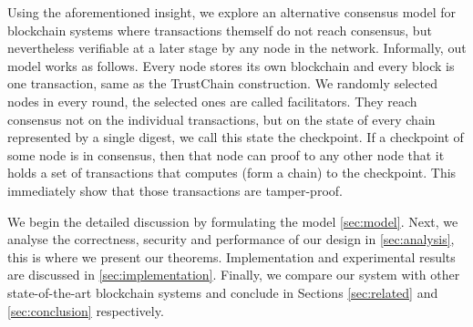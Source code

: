 Using the aforementioned insight,
we explore an alternative consensus model for blockchain systems where transactions themself do not reach consensus,
but nevertheless verifiable at a later stage by any node in the network.
Informally, out model works as follows.
Every node stores its own blockchain and every block is one transaction, same as the TrustChain construction.
We randomly selected nodes in every round, the selected ones are called facilitators.
They reach consensus not on the individual transactions,
but on the state of every chain represented by a single digest, we call this state the checkpoint.
If a checkpoint of some node is in consensus, 
then that node can proof to any other node that it holds a set of transactions that computes (form a chain) to the checkpoint.
This immediately show that those transactions are tamper-proof.

We begin the detailed discussion by formulating the model \autoref{sec:model}. 
Next, we analyse the correctness, security and performance of our design in \autoref{sec:analysis},
this is where we present our theorems.
Implementation and experimental results are discussed in \autoref{sec:implementation}.
Finally, we compare our system with other state-of-the-art blockchain systems and conclude in Sections \ref{sec:related} and \ref{sec:conclusion} respectively.


